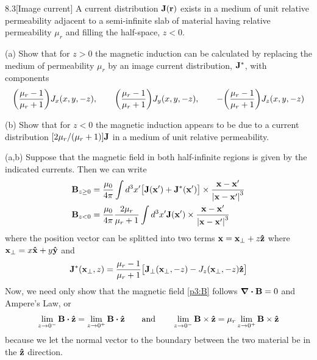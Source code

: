 \documentclass[12pt]{article}
\begin{document}
\begin{problem}{8.3}[Image current]
A current distribution $\vb{J}(\vb{r})$ exists in a medium of unit relative
permeability adjacent to a semi-infinite slab of material having relative
permeability $\mu_r$ and filling the half-space, $z<0$.

(a) Show that for $z>0$ the magnetic induction can be calculated by replacing
the medium of permeability $\mu_r$ by an image current distribution,
$\vb{J}^\ast$, with components
\begin{equation}
    \qty(\frac{\mu_r-1}{\mu_r+1})J_x(x,y,-z),
    \qquad
    \qty(\frac{\mu_r-1}{\mu_r+1})J_y(x,y,-z),
    \qquad
    -\qty(\frac{\mu_r-1}{\mu_r+1})J_z(x,y,-z)
\end{equation}

(b) Show that for $z<0$ the magnetic induction appears to be due to a current
distribution $[2\mu_r /(\mu_r+1)]\vb{J}$ in a medium of unit relative
permeability.
\begin{solution}
(a,b) Suppose that the magnetic field in both half-infinite regions is given by
the indicated currents. Then we can write
\begin{subequations}\label{p3:B}
    \begin{align}
        \vb{B}_{z\geq0}
        &=\frac{\mu_0}{4\pi}\int
        d^3x'\qty[\vb{J}(\vb{x}')+\vb{J}^\ast(\vb{x}')]\times\frac{\vb{x}-\vb{x}'}{\abs{\vb{x}-\vb{x}'}^3}\\
        \vb{B}_{z<0}
        &=\frac{\mu_0}{4\pi}\frac{2\mu_r}{\mu_r+1}
        \int d^3x'\vb{J}(\vb{x}')\times\frac{\vb{x}-\vb{x}'}{\abs{\vb{x}-\vb{x}'}^3}
    \end{align} 
\end{subequations}
where the position vector can be splitted into two terms
$\vb{x}=\vb{x}_\bot+z\vb{\hat{z}}$ where $\vb{x}_\bot=x\vb{\hat{x}}+y\vb{\hat{y}}$ and
\begin{equation}
    \vb{J}^\ast(\vb{x}_\perp,z) 
    =\frac{\mu_r-1}{\mu_r+1}\qty[\vb{J}_\bot(\vb{x}_\bot,-z)-J_z(\vb{x}_\bot,-z)\vb{\hat{z}}]
\end{equation}
Now, we need only show that the magnetic field \eqref{p3:B} follows  
$\div{\vb{B}}=0$ and Ampere's Law, or
\begin{equation}
    \lim_{z\to0^-}\vb{B}\vdot\zhat=\lim_{z\to0^+}\vb{B}\vdot\zhat 
    \qquad\text{and}\qquad
    \lim_{z\to0^-}\vb{B}\times\zhat=\mu_r\lim_{z\to0^+}\vb{B}\times\zhat
\end{equation}
because we let the normal vector to the boundary between the two material be in 
the $\vb{\hat{z}}$ direction.


\end{solution}
\end{problem}
\end{document}
